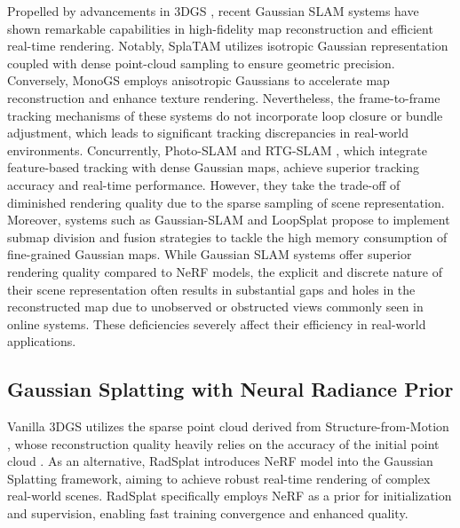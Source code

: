 Propelled by advancements in 3DGS \cite{kerbl20233d}, recent Gaussian SLAM systems \cite{yan2024gs,ha2024rgbd,li2025sgs,deng2024compact,hu2025cg} have shown remarkable capabilities in high-fidelity map reconstruction and efficient real-time rendering. Notably, SplaTAM \cite{keetha2024splatam} utilizes isotropic Gaussian representation coupled with dense point-cloud sampling to ensure geometric precision. Conversely, MonoGS \cite{matsuki2024gaussian} employs anisotropic Gaussians to accelerate map reconstruction and enhance texture rendering. Nevertheless, the frame-to-frame tracking mechanisms of these systems do not incorporate loop closure or bundle adjustment, which leads to significant tracking discrepancies in real-world environments. Concurrently, Photo-SLAM \cite{huang2024photo} and RTG-SLAM \cite{peng2024rtg}, which integrate feature-based tracking \cite{mur2017orb,campos2021orb} with dense Gaussian maps, achieve superior tracking accuracy and real-time performance. However, they take the trade-off of diminished rendering quality due to the sparse sampling of scene representation. Moreover, systems such as Gaussian-SLAM \cite{yugay2023gaussian} and LoopSplat \cite{zhu2024loopsplat} propose to implement submap division and fusion strategies to tackle the high memory consumption of fine-grained Gaussian maps. While Gaussian SLAM systems offer superior rendering quality compared to NeRF models, the explicit and discrete nature of their scene representation often results in substantial gaps and holes in the reconstructed map due to unobserved or obstructed views commonly seen in online systems. These deficiencies severely affect their efficiency in real-world applications.

\subsection{Gaussian Splatting with Neural Radiance Prior}

Vanilla 3DGS \cite{kerbl20233d} utilizes the sparse point cloud derived from Structure-from-Motion \cite{bregler2000recovering,schonberger2016structure}, whose reconstruction quality heavily relies on the accuracy of the initial point cloud \cite{jung2024relaxing}. As an alternative, RadSplat \cite{niemeyer2024radsplat} introduces NeRF model \cite{mildenhall2021nerf} into the Gaussian Splatting framework, aiming to achieve robust real-time rendering of complex real-world scenes. RadSplat \cite{niemeyer2024radsplat} specifically employs NeRF as a prior for initialization and supervision, enabling fast training convergence and enhanced quality.

